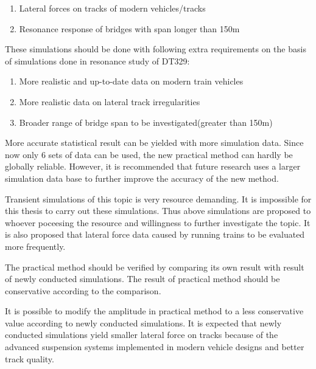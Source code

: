\begin{enumerate}
    \item Lateral forces on tracks of modern vehicles/tracks
    \item Resonance response of bridges with span longer than 150m
\end{enumerate}

These simulations should be done with following extra requirements on the basis of simulations done in resonance study of DT329:

\begin{enumerate}
    \item More realistic and up-to-date data on modern train vehicles
    \item More realistic data on lateral track irregularities
    \item Broader range of bridge span to be investigated(greater than 150m)
\end{enumerate}

More accurate statistical result can be yielded with more simulation data. Since now only 6 sets of data can be used, the new practical method can hardly be globally reliable. However, it is recommended that future research uses a larger simulation data base to further improve the accuracy of the new method.

Transient simulations of this topic is very resource demanding. It is impossible for this thesis to carry out these simulations. Thus above simulations are proposed to whoever poceesing the resource and willingness to further investigate the topic. It is also proposed that lateral force data caused by running trains to be evaluated more frequently.

The practical method should be verified by comparing its own result with result of newly conducted simulations. The result of practical method should be conservative according to the comparison. 

It is possible to modify the amplitude in practical method to a less conservative value according to newly conducted simulations. It is expected that newly conducted simulations yield smaller lateral force on tracks because of the advanced suspension systems implemented in modern vehicle designs and better track quality.